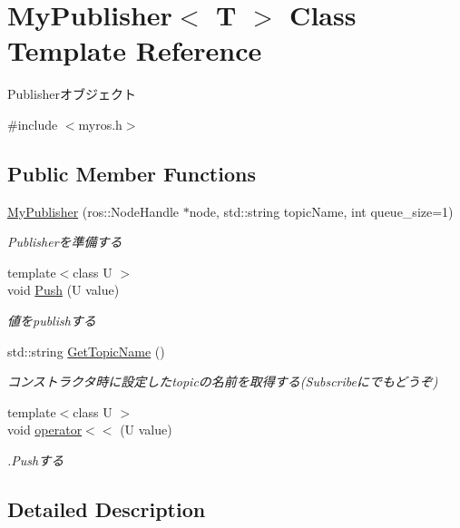 \hypertarget{classMyPublisher}{\section{My\-Publisher$<$ T $>$ Class Template Reference}
\label{classMyPublisher}
}


Publisherオブジェクト  




{\ttfamily \#include $<$myros.\-h$>$}

\subsection*{Public Member Functions}
\begin{DoxyCompactItemize}
\item 
\hyperlink{classMyPublisher_a3ce5354492470a4f3147d52826014815}{My\-Publisher} (ros\-::\-Node\-Handle $\ast$node, std\-::string topic\-Name, int queue\-\_\-size=1)
\begin{DoxyCompactList}\small\item\em Publisherを準備する \end{DoxyCompactList}\item 
{\footnotesize template$<$class U $>$ }\\void \hyperlink{classMyPublisher_a429cb336dc3423784854cf5b8bb10883}{Push} (U value)
\begin{DoxyCompactList}\small\item\em 値をpublishする \end{DoxyCompactList}\item 
std\-::string \hyperlink{classMyPublisher_ac3746c9df0fd15b945acd7880c5fbc94}{Get\-Topic\-Name} ()
\begin{DoxyCompactList}\small\item\em コンストラクタ時に設定したtopicの名前を取得する(Subscribeにでもどうぞ) \end{DoxyCompactList}\item 
{\footnotesize template$<$class U $>$ }\\void \hyperlink{classMyPublisher_a8b0d70721eb56b66cc00ce7bd192e76c}{operator$<$$<$} (U value)
\begin{DoxyCompactList}\small\item\em .Pushする \end{DoxyCompactList}\end{DoxyCompactItemize}


\subsection{Detailed Description}
